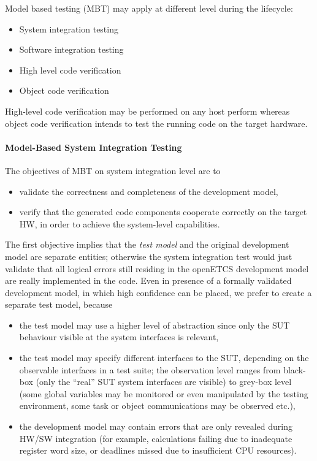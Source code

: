 \documentclass{template/openetcs_report}
\begin{document}
Model based testing (MBT) may apply at different level during the
lifecycle:
\begin{itemize}
\item System integration testing
\item Software integration testing
\item High level code verification
\item Object code verification
\end{itemize}
High-level code verification may be performed on any host perform
whereas object code verification intends to test the running code on
the target hardware.

\paragraph{Model-Based System Integration Testing}
The objectives of MBT on system integration level are to
\begin{itemize}
\item validate the correctness and completeness of the development model,
\item verify that the generated code components cooperate correctly on the target HW, in 
order to achieve the system-level capabilities.
\end{itemize}

The first objective implies that the {\it test model} and the original
development model are separate entities; otherwise the system
integration test would just validate that all logical errors still
residing in the openETCS development model are really implemented in
the code. Even in presence of a formally validated development model,
in which high confidence can be placed, we prefer to create a separate
test model, because
\begin{itemize}
\item the test model may use a higher level of abstraction since only the SUT behaviour visible at the 
system interfaces is relevant,

\item the test model may specify different interfaces to the SUT,
  depending on the observable interfaces in a test suite; the
  observation level ranges from black-box (only the ``real'' SUT
  system interfaces are visible) to grey-box level (some global
  variables may be monitored or even manipulated by the testing
  environment, some task or object communications may be observed
  etc.),

\item the development model may contain errors that are only revealed
  during HW/SW integration (for example, calculations failing due to
  inadequate register word size, or deadlines missed due to
  insufficient CPU resources).
\end{itemize}
\end{document}
